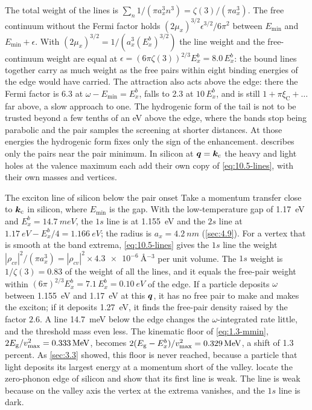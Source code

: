 The total weight of the lines is $\sum_n 1/(\pi a_x^3n^3) = \zeta(3)/(\pi a_x^3)$. The free continuum without the Fermi factor holds $(2\mu_x)^{3/2}\epsilon^{3/2}/6\pi^2$ between $E_{\mathrm{min}}$ and $E_{\mathrm{min}} + \epsilon$. With $(2\mu_x)^{3/2} = 1/(a_x^3(E_x^b)^{3/2})$ the line weight and the free-continuum weight are equal at $\epsilon = (6\pi\zeta(3))^{2/3}E_x^b = 8.0\,E_x^b$: the bound lines together carry as much weight as the free pairs within eight binding energies of the edge would have carried. The attraction also acts above the edge: there the Fermi factor is $6.3$ at $\omega - E_{\mathrm{min}} = E_x^b$, falls to 2.3 at $10\,E_x^b$, and is still $1 + \pi\xi_{\mathrm{C}} + \dots$ far above, a slow approach to one. The hydrogenic form of the tail is not to be trusted beyond a few tenths of an eV above the edge, where the bands stop being parabolic and the pair samples the screening at shorter distances. At those energies the hydrogenic form fixes only the sign of the enhancement.  describes only the pairs near the pair minimum. In silicon at $\bm{q} = \bm{k}_{\mathrm{c}}$ the heavy and light holes at the valence maximum each add their own copy of \cref{eq:10.5-lines}, with their own masses and vertices.

\begin{workedexample}{The exciton line of silicon below the pair onset}\label{we:10-xline}
Take a momentum transfer close to $\bm{k}_{\mathrm{c}}$ in silicon, where $E_{\mathrm{min}}$ is the gap. With the low-temperature gap of \SI{1.17}{eV} and $E_x^b = \SI{14.7}{meV}$, the $1s$ line is at \SI{1.155}{eV} and the $2s$ line at $\SI{1.17}{eV} - E_x^b/4 = \SI{1.166}{eV}$; the radius is $a_x = \SI{4.2}{nm}$ (\cref{sec:4.9}). For a vertex that is smooth at the band extrema, \cref{eq:10.5-lines} gives the $1s$ line the weight $|\rho_{cv}|^2/(\pi a_x^3) = |\rho_{cv}|^2\times\SI{4.3e-6}{\angstrom^{-3}}$ per unit volume. The $1s$ weight is $1/\zeta(3) = 0.83$ of the weight of all the lines, and it equals the free-pair weight within $(6\pi)^{2/3}E_x^b = 7.1\,E_x^b = \SI{0.10}{eV}$ of the edge. If a particle deposits $\omega$ between \SI{1.155}{eV} and \SI{1.17}{eV} at this $\bm{q}$, it has no free pair to make and makes the exciton; if it deposits \SI{1.27}{eV}, it finds the free-pair density raised by the factor $2.6$. A line \SI{14.7}{meV} below the edge changes the $\omega$-integrated rate little, and the threshold mass even less. The kinematic floor of \cref{eq:1.3-mmin}, $2E_{\mathrm{g}}/v_{\mathrm{max}}^2 = \SI{0.333}{MeV}$, becomes $2(E_{\mathrm{g}} - E_x^b)/v_{\mathrm{max}}^2 = \SI{0.329}{MeV}$, a shift of 1.3 percent. As \cref{sec:3.3} showed, this floor is never reached, because a particle that light deposits its largest energy at a momentum short of the valley.  locate the zero-phonon edge of silicon and show that its first line is weak. The line is weak because on the valley axis the vertex at the extrema vanishes, and the $1s$ line is dark.
\end{workedexample}

